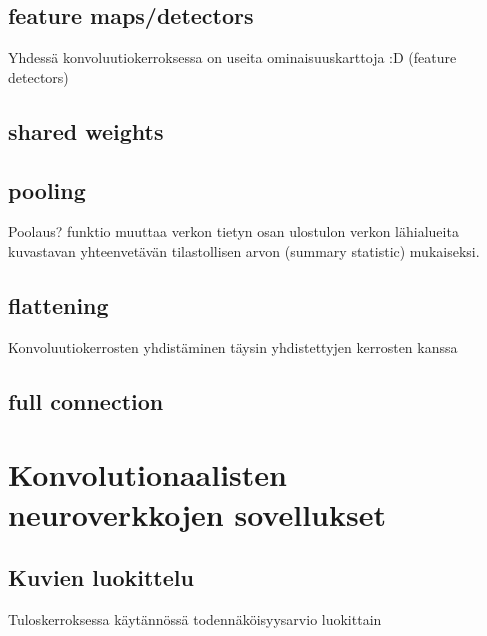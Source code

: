 \documentclass[finnish]{tktltiki2}
\theoremstyle{definition}
\theoremstyle{remark}
\begin{document}
  \subsection{feature maps/detectors}
  Yhdessä konvoluutiokerroksessa on useita ominaisuuskarttoja :D (feature detectors) 

  \subsection{shared weights}

  \subsection{pooling}
  Poolaus? funktio muuttaa verkon tietyn osan ulostulon verkon lähialueita kuvastavan yhteenvetävän tilastollisen arvon (summary statistic) mukaiseksi.
  \subsection{flattening}
  Konvoluutiokerrosten yhdistäminen täysin yhdistettyjen kerrosten kanssa

  \subsection{full connection}

  \section{Konvolutionaalisten neuroverkkojen sovellukset}
  \subsection{Kuvien luokittelu}
  Tuloskerroksessa käytännössä todennäköisyysarvio luokittain












  \nocite{*}
  
  





  
\end{document}
